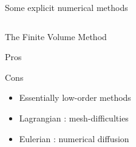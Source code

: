 \begin{withoutheadline}
\begin{frame}{Some explicit numerical methods}
\begin{overprint}
\begin{columns}
\begin{column}{0.49\textwidth}
\begin{block}{The Finite Volume Method \cite{Leveque}}
\begin{footnotesize}
\begin{block}{\footnotesize Pros}
\begin{itemize}
                \end{itemize}
              \end{block}
              \vspace{-0.2cm}
              \begin{block}{\footnotesize Cons}
                \vspace{-0.2cm}
                \begin{itemize}
                \item[] Essentially low-order methods
                \item[] Lagrangian \cite{Haider_FVM}: mesh-difficulties %
                \item[] Eulerian \cite{Nicolas}: numerical diffusion%
                \end{itemize}
              \end{block}
            \end{footnotesize}
          \end{block}
        \end{column}
      \end{columns}
      
      \vspace{-0.3cm} 
    \end{overprint}
  \end{frame}
\end{withoutheadline}


